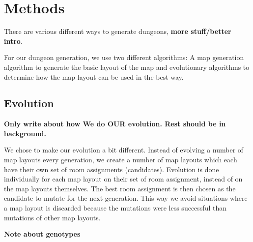 \section{Methods}
\label{04}

There are various different ways to generate dungeons\cite[Chapter 3]{PCGBook}, \textbf{more stuff/better intro}.

For our dungeon generation, we use two different algorithms: A map generation algorithm to generate the basic layout of the map and evolutionary algorithms\cite[Chapter 2]{IoEC} to determine how the map layout can be used in the best way.

\subsection{Evolution}
\label{04_Evolution}

\textbf{Only write about how We do OUR evolution. Rest should be in background.}

We chose to make our evolution a bit different. Instead of evolving a number of map layouts every generation, we create a number of map layouts which each have their own set of room assignments (candidates). Evolution is done individually for each map layout on their set of room assignment, instead of on the map layouts themselves. The best room assignment is then chosen as the candidate to mutate for the next generation. This way we avoid situations where a map layout is discarded because the mutations were less successful than mutations of other map layouts.

\textbf{Note about genotypes}


